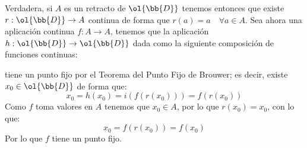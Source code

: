 \begin{ejercicio}
\begin{enumerate}[label=\alph*)]
            Verdadera, si $A$ es un retracto de $\ol{\bb{D}}$ tenemos entonces que existe $r:\ol{\bb{D}}\to A$ continua de forma que $r(a) = a\quad \forall a\in A$. Sea ahora una aplicación continua $f:A\to A$, tenemos que la aplicación $h:\ol{\bb{D}}\to \ol{\bb{D}}$ dada como la siguiente composición de funciones continuas:
            \begin{figure}[H]
                \centering
            \end{figure}
            tiene un punto fijo por el Teorema del Punto Fijo de Brouwer; es decir, existe $x_0\in \ol{\bb{D}}$ de forma que:
            \begin{equation*}
                x_0 = h(x_0) = i(f(r(x_0))) = f(r(x_0))
            \end{equation*}
            Como $f$ toma valores en $A$ tenemos que $x_0\in A$, por lo que $r(x_0 ) =x_0$, con lo que:
            \begin{equation*}
                x_0 = f(r(x_0)) = f(x_0)
            \end{equation*}
            Por lo que $f$ tiene un punto fijo.
    \end{enumerate}
\end{ejercicio}
